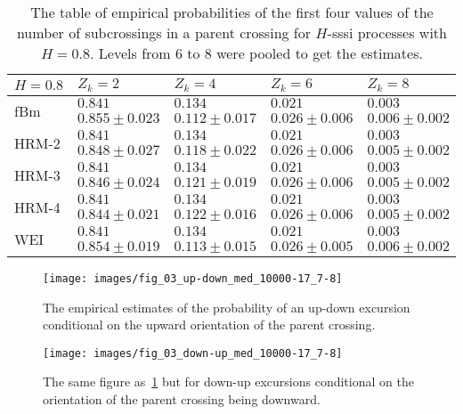 \begin{table}[h]\begin{center}
	\begin{tabular}{l||l|l|l|l|}
					$H=0.8$ & $Z_k = 2$ & $Z_k = 4$ & $Z_k = 6$ & $Z_k = 8$ \\ \hline\hline
	\multirow{2}{*}{fBm} 	& $0.841$ & $0.134$ & $0.021$ & $0.003$ \\ \cline{2-5}
 							& $0.855\pm0.023$ & $0.112\pm0.017$ & $0.026\pm0.006$ & $0.006\pm0.002$ \\ \hline\hline
	\multirow{2}{*}{HRM-2} 	& $0.841$ & $0.134$ & $0.021$ & $0.003$ \\ \cline{2-5}
 							& $0.848\pm0.027$ & $0.118\pm0.022$ & $0.026\pm0.006$ & $0.005\pm0.002$ \\ \hline\hline
	\multirow{2}{*}{HRM-3} 	& $0.841$ & $0.134$ & $0.021$ & $0.003$ \\ \cline{2-5}
 							& $0.846\pm0.024$ & $0.121\pm0.019$ & $0.026\pm0.006$ & $0.005\pm0.002$ \\ \hline\hline
	\multirow{2}{*}{HRM-4} 	& $0.841$ & $0.134$ & $0.021$ & $0.003$ \\ \cline{2-5}
 							& $0.844\pm0.021$ & $0.122\pm0.016$ & $0.026\pm0.006$ & $0.005\pm0.002$ \\ \hline\hline
	\multirow{2}{*}{WEI} 	& $0.841$ & $0.134$ & $0.021$ & $0.003$ \\ \cline{2-5}
 							& $0.854\pm0.019$ & $0.113\pm0.015$ & $0.026\pm0.005$ & $0.006\pm0.002$ \\ \hline\hline
	\end{tabular}
	\caption{The table of empirical probabilities of the first four values of the number
	of subcrossings in a parent crossing for $H$-sssi processes with $H=0.8$. Levels from
	6 to 8 were pooled to get the estimates.}
\label{tbl:empirical_probs_02}
\end{center}\end{table}

\begin{figure}[htb]\begin{center}
    \texttt{[image: images/fig\_03\_up-down\_med\_10000-17\_7-8]}
    \caption{The empirical estimates of the probability of an up-down excursion conditional on
    the upward orientation of the parent crossing.}
\label{fig:all_offspring_up_down}
\end{center}\end{figure}

\begin{figure}[htb]\begin{center}
    \texttt{[image: images/fig\_03\_down-up\_med\_10000-17\_7-8]}
    \caption{The same figure as~\ref{fig:all_offspring_up_down} but for down-up excursions
    conditional on the orientation of the parent crossing being downward.}
\label{fig:all_offspring_down_up}
\end{center}\end{figure}


